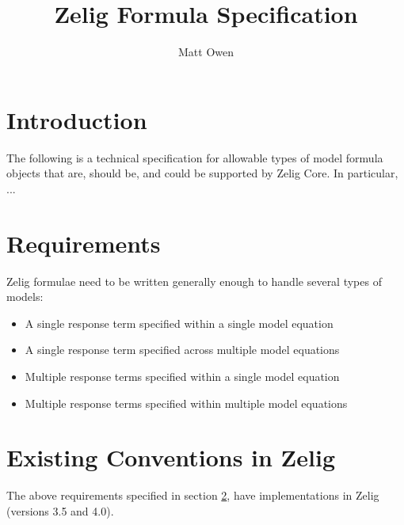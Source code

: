 \documentclass{article}
\title{Zelig Formula Specification}
\author{Matt Owen}
\begin{document}
\maketitle

\section{Introduction}

The following is a technical specification for allowable types of model formula
objects that are, should be, and could be supported by Zelig Core. In
particular, ...



%
%
%
\section{Requirements}
\label{sec:req}

Zelig formulae need to be written generally enough to handle several types of
models:

\begin{itemize}

  \item A single response term specified within a single model equation

  \item A single response term specified across multiple model equations

  \item Multiple response terms specified within a single model equation

  \item Multiple response terms specified within multiple model equations
\end{itemize}




%
%
%
\section{Existing Conventions in Zelig}
\label{sec:existing-zelig}

The above requirements specified in section \ref{sec:req}, have implementations
in Zelig (versions 3.5 and 4.0).
\end{document}
